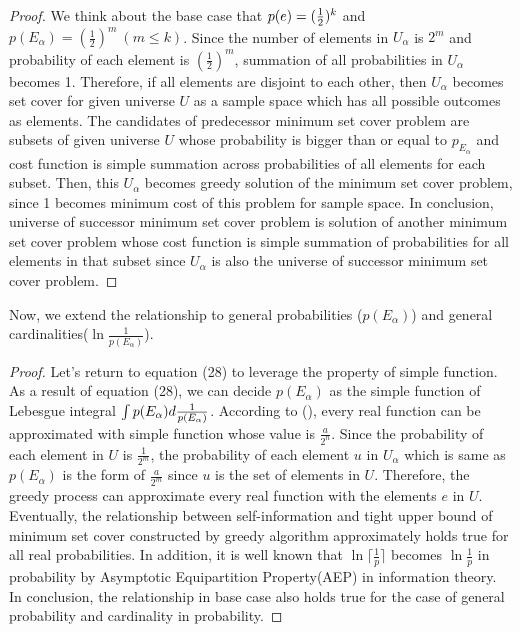 \begin{proof}
We think about the base case that $p(e)=({1 \over 2})^k$ and $p({E_{\alpha}})=(\frac{1}{2})^m\ (m \le k)$.
Since the number of elements in $U_{\alpha}$ is $2^m$ and probability of each element is $(\frac{1}{2})^m$, 
summation of all probabilities in $U_{\alpha}$ becomes 1. 
Therefore, if all elements are disjoint to each other, then $U_{\alpha}$ becomes set cover 
for given universe $U$ as a sample space which has all possible outcomes as elements.
The candidates of predecessor minimum set cover problem are subsets of given universe $U$ 
whose probability is bigger than or equal to $p_{E_{\alpha}}$ 
and cost function is simple summation across probabilities of all elements for each subset. 
Then, this $U_{\alpha}$ becomes greedy solution of the minimum set cover problem, 
since 1 becomes minimum cost of this problem for sample space.
In conclusion, universe of successor minimum set cover problem is solution of another minimum set cover problem 
whose cost function is simple summation of probabilities for all elements in that subset
since $U_{\alpha}$ is also the universe of successor minimum set cover problem.  
\end{proof}


Now, we extend the relationship to general probabilities ($p({E_{\alpha}})$) 
and general cardinalities($\ln\frac{1}{p({E_{\alpha}})}$).
\begin{proof}
Let's return to equation (28) to leverage the property of simple function. 
As a result of equation (28), we can decide $p({E_{\alpha}})$ as the simple function of Lebesgue integral 
$\int p({E_{\alpha}})d{1\over p({E_{\alpha}})}$.
According to (\cite{KwonY12}), every real function can be approximated with simple function 
whose value is $\frac{a}{2^n}$.
Since the probability of each element in $U$ is $\frac{1}{2^m}$, 
the probability of each element $u$ in $U_{\alpha}$ which is same as $p({E_{\alpha}})$ 
is the form of $\frac{a}{2^m}$ since $u$ is the set of elements in $U$.
Therefore, the greedy process can approximate every real function with the elements $e$ in $U$.
Eventually, the relationship between self-information and tight upper bound of minimum set cover 
constructed by greedy algorithm approximately holds true for all real probabilities.
In addition, it is well known that $\ln\lceil\frac{1}{p}\rceil$ becomes $\ln\frac{1}{p}$ in probability
by Asymptotic Equipartition Property(AEP) in information theory.
In conclusion, the relationship in base case also holds true for the case of general probability and cardinality 
in probability.
\end{proof}


